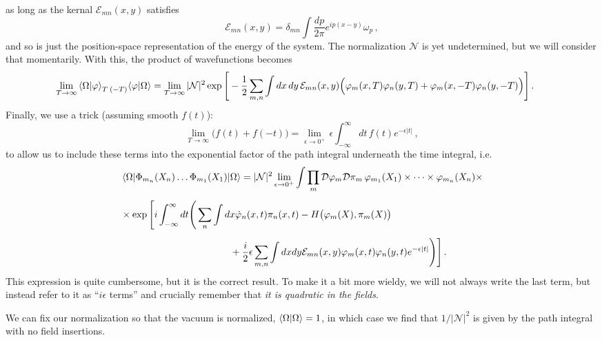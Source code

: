 \documentclass{article}
\numberwithin{equation}{subsection}
\begin{document}
as long as the kernal $\mathcal{E}_{mn}(x, y)$ satisfies
\begin{equation}
    \mathcal{E}_{mn}(x, y) = \delta_{mn}\int\frac{dp}{2\pi}e^{ip(x - y)}\omega_p\,,
\end{equation}
and so is just the position-space representation of the energy of the system. The normalization $\mathcal{N}$ is yet undetermined, but we will consider that momentarily. 
With this, the product of wavefunctions becomes
\begin{equation}
\hspace{-0.5cm}
    \lim_{T\to\infty}\braket{\Omega}{\varphi}_T\prescript{}{(-T)}{\braket{\varphi}{\Omega}} =\lim_{T\to\infty} |\mathcal{N}|^2\exp\Bigg[-\frac{1}{2}\sum_{m,n}
	\int dx\,dy\,\mathcal{E}_{mn}(x, y)\Big(\varphi_m(x,T)\varphi_n(y,T) + \varphi_m(x,-T)\varphi_n(y,-T)\Big)\Bigg]\,.
\end{equation}
Finally, we use a trick (assuming smooth $f(t)$):
\begin{equation}
    \lim_{T\to\infty}\big(f(t) + f(-t)\big) = \lim_{\epsilon \to 0^+}\,\epsilon \int_{-\infty}^\infty dt\,f(t)e^{-\epsilon |t|}\,,
\end{equation}
to allow us to include these terms into the exponential factor of the path integral underneath the time integral, i.e.
\begin{equation}\begin{split}\label{eq:genPI}
    &\mel{\Omega}{\Phi_{m_n}(X_n)\dots \Phi_{m_1}(X_1)}{\Omega} = |\mathcal{N}|^2\lim_{\epsilon\to 0^+}\int\prod_m\mathcal{D}\varphi_m\mathcal{D}\pi_m\,\varphi_{m_1}(X_1)\times\dots
	\times\varphi_{m_n}(X_n)\times \\[0.5em]
    &\times\exp\Bigg[i\int_{-\infty}^{\infty}dt\Bigg(\sum_n\int dx\dot{\varphi}_n(x,t)\pi_n(x,t) - H\big(\varphi_m(X), \pi_m(X)\big) \\[0.5em]
    &\hspace{4cm}+ \frac{i}{2}\epsilon\sum_{m,n}\int dx dy \mathcal{E}_{mn}(x, y)\varphi_m(x,t)\varphi_n(y,t) e^{-\epsilon|t|}\Bigg)\Bigg]\,.
\end{split}\end{equation}
This expression is quite cumbersome, but it is the correct result. To make it a bit more wieldy, we will not always write the last term, but instead refer to it as ``$i\epsilon$ terms'' 
and crucially remember that \textit{it is quadratic in the fields}.

We can fix our normalization so that the vacuum is normalized, $\braket{\Omega}{\Omega} = 1$, in which case we find that $1/|\mathcal{N}|^2$ is given by the path integral with no field insertions.
\end{document}
